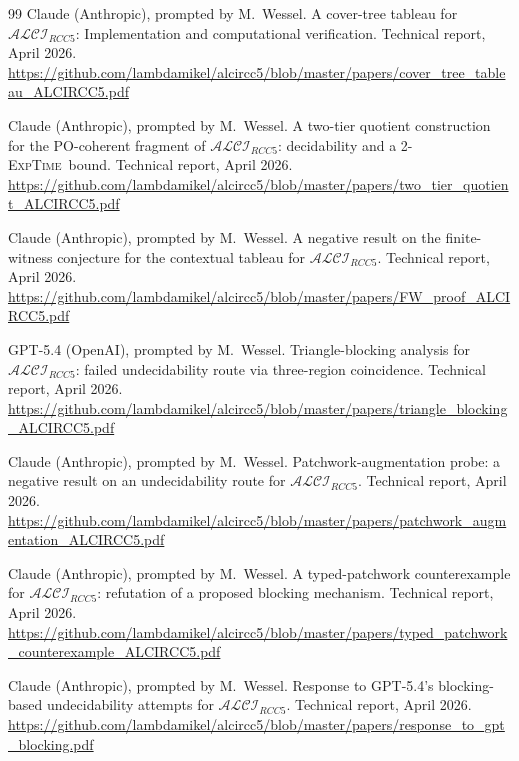 \documentclass[
]{ceurart}
\theoremstyle{definition}
\newcommand{\ALCIRCC}[1]{\ensuremath{\mathcal{ALCI}_{\mathit{RCC#1}}}}
\newcommand{\EXPTIME}{\textsc{ExpTime}}
\begin{document}
\begin{thebibliography}{99}
Claude (Anthropic), prompted by M.\ Wessel.
\newblock A cover-tree tableau for $\ALCIRCC{5}$:
  Implementation and computational verification.
\newblock Technical report, April 2026.
\newblock \url{https://github.com/lambdamikel/alcircc5/blob/master/papers/cover_tree_tableau_ALCIRCC5.pdf}

Claude (Anthropic), prompted by M.\ Wessel.
\newblock A two-tier quotient construction for the PO-coherent
  fragment of $\ALCIRCC{5}$: decidability and a 2-\EXPTIME\ bound.
\newblock Technical report, April 2026.
\newblock \url{https://github.com/lambdamikel/alcircc5/blob/master/papers/two_tier_quotient_ALCIRCC5.pdf}


Claude (Anthropic), prompted by M.\ Wessel.
\newblock A negative result on the finite-witness conjecture for
  the contextual tableau for $\ALCIRCC{5}$.
\newblock Technical report, April 2026.
\newblock \url{https://github.com/lambdamikel/alcircc5/blob/master/papers/FW_proof_ALCIRCC5.pdf}

GPT-5.4 (OpenAI), prompted by M.\ Wessel.
\newblock Triangle-blocking analysis for $\ALCIRCC{5}$: failed
  undecidability route via three-region coincidence.
\newblock Technical report, April 2026.
\newblock \url{https://github.com/lambdamikel/alcircc5/blob/master/papers/triangle_blocking_ALCIRCC5.pdf}

Claude (Anthropic), prompted by M.\ Wessel.
\newblock Patchwork-augmentation probe: a negative result on an
  undecidability route for $\ALCIRCC{5}$.
\newblock Technical report, April 2026.
\newblock \url{https://github.com/lambdamikel/alcircc5/blob/master/papers/patchwork_augmentation_ALCIRCC5.pdf}

Claude (Anthropic), prompted by M.\ Wessel.
\newblock A typed-patchwork counterexample for $\ALCIRCC{5}$:
  refutation of a proposed blocking mechanism.
\newblock Technical report, April 2026.
\newblock \url{https://github.com/lambdamikel/alcircc5/blob/master/papers/typed_patchwork_counterexample_ALCIRCC5.pdf}

Claude (Anthropic), prompted by M.\ Wessel.
\newblock Response to GPT-5.4's blocking-based undecidability
  attempts for $\ALCIRCC{5}$.
\newblock Technical report, April 2026.
\newblock \url{https://github.com/lambdamikel/alcircc5/blob/master/papers/response_to_gpt_blocking.pdf}


\end{thebibliography}
\end{document}
